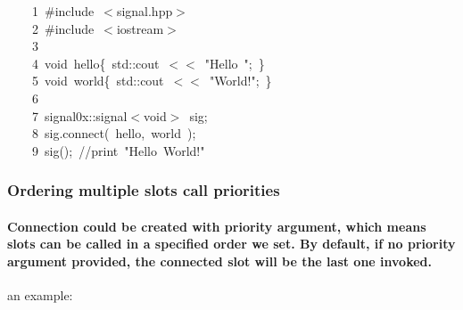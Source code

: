 \documentclass[9pt,onside,a4paper]{article}
\newcommand{\hlstd}[1]{\textcolor[rgb]{0.2,0,0.4}{#1}}
\newcommand{\hlstr}[1]{\textcolor[rgb]{0.09,0.38,0.65}{#1}}
\newcommand{\hlslc}[1]{\textcolor[rgb]{0,0.4,0.2}{#1}}
\newcommand{\hlppc}[1]{\textcolor[rgb]{0.33,0.45,0.69}{#1}}
\newcommand{\hlopt}[1]{\textcolor[rgb]{0.33,0.33,0.33}{#1}}
\newcommand{\hllin}[1]{\textcolor[rgb]{0.6,0.6,0.6}{#1}}
\newcommand{\hlkwb}[1]{\textcolor[rgb]{0.96,0.55,0.14}{#1}}
\newcommand{\hlkwd}[1]{\textcolor[rgb]{0.82,0.11,0.93}{#1}}
\begin{document}
\noindent
\ttfamily
\hlstd{}\hllin{\ \ \ \ 1\ }\hlppc{\#include\ $<$signal.hpp$>$}\\
\hllin{\ \ \ \ 2\ }\hlstd{}\hlppc{\#include\ $<$iostream$>$}\\
\hllin{\ \ \ \ 3\ }\hlstd{}\\
\hllin{\ \ \ \ 4\ }\hlkwb{void\ }\hlstd{hello}\hlopt{\{\ }\hlstd{std}\hlopt{::}\hlstd{cout\ }\hlopt{$<$$<$\ }\hlstd{}\hlstr{"Hello\ "}\hlstd{}\hlopt{;\ \}}\\
\hllin{\ \ \ \ 5\ }\hlstd{}\hlkwb{void\ }\hlstd{world}\hlopt{\{\ }\hlstd{std}\hlopt{::}\hlstd{cout\ }\hlopt{$<$$<$\ }\hlstd{}\hlstr{"World!"}\hlstd{}\hlopt{;\ \}}\\
\hllin{\ \ \ \ 6\ }\hlstd{\\
\hllin{\ \ \ \ 7\ }signal0x}\hlopt{::}\hlstd{signal}\hlopt{$<$}\hlstd{}\hlkwb{void}\hlstd{}\hlopt{$>$\ }\hlstd{sig}\hlopt{;}\\
\hllin{\ \ \ \ 8\ }\hlstd{sig}\hlopt{.}\hlstd{}\hlkwd{connect}\hlstd{}\hlopt{(\ }\hlstd{hello}\hlopt{,\ }\hlstd{world\ }\hlopt{);}\\
\hllin{\ \ \ \ 9\ }\hlstd{}\hlkwd{sig}\hlstd{}\hlopt{();\ }\hlstd{}\hlslc{//print\ "Hello\ World!"}\hlstd{}\\
\mbox{}
\normalfont
\normalsize

\subsubsection{Ordering multiple slots call priorities}

\paragraph{Connection could be created with priority argument, which means slots can be called in a specified order we set. By default, if no priority argument provided, the connected slot will be the last one invoked.\\}
an example: \\
\end{document}
